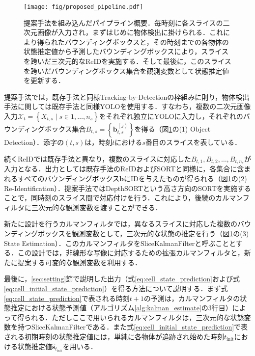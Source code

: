     \begin{figure}[t]
        \centering
        \texttt{[image: fig/proposed\_pipeline.pdf]}
        \caption[提案手法を組み込んだパイプライン概要]{提案手法を組み込んだパイプライン概要．毎時刻に各スライスの二次元画像が入力され，まずはじめに物体検出に掛けられる．これにより得られたバウンディングボックスと，その時刻までの各物体の状態推定値から予測したバウンディングボックスにより，スライスを跨いだ三次元的なReIDを実施する．そして最後に，このスライスを跨いだバウンディングボックス集合を観測変数として状態推定値を更新する．}
        \label{fig:proposed_pipeline}
    \end{figure}

    提案手法では，既存手法と同様Tracking-by-Detectionの枠組みに則り，物体検出手法に関しては既存手法と同様YOLOを使用する．すなわち，複数の二次元画像入力$\mathcal{X}_t = \left\{X_{t, s} \mid s \in {1, \dots, n_s}\right\}$をそれぞれ独立にYOLOに入力し，それぞれのバウンディングボックス集合$B_{t,s} = \left\{\bm{b}_{t,s}^{(j)}\right\}$を得る（図\ref{fig:proposed_pipeline}の(1) Object Detection）．添字の$(t,s)$は，時刻$t$における$s$番目のスライスを表している．

    続くReIDでは既存手法と異なり，複数のスライスに対応した$B_{t,1}, B_{t,2}, \dots, B_{t,n_s}$が入力となる．出力としては既存手法のReIDおよびSORTと同様に，各集合に含まれるすべてのバウンディングボックス$\bm{b}$にIDを与えたものが得られる（図\ref{fig:proposed_pipeline}の(2) Re-Identification）．提案手法ではDepthSORTという高さ方向のSORTを実施することで，同時刻のスライス間で対応付けを行う．これにより，後続のカルマンフィルタに三次元的な観測変数を渡すことができる．

    新たに設計を行うカルマンフィルタでは，異なるスライスに対応した複数のバウンディングボックスを観測変数として，三次元的な状態の推定を行う（図\ref{fig:proposed_pipeline}の(3) State Estimation）．このカルマンフィルタをSliceKalmanFilterと呼ぶこととする．この設計では，非線形な写像に対応するための拡張カルマンフィルタと，新たに提案する可変的な観測変数を利用する．

    最後に，\ref{sec:setting}節で説明した出力（式\ref{eq:cell_state_prediction}および式\ref{eq:cell_initial_state_prediction}）を得る方法について説明する．まず式\ref{eq:cell_state_prediction}で表される時刻$t+1$の予測は，カルマンフィルタの状態推定における状態予測値（アルゴリズム\ref{alg:kalman_estimate}の3行目）によって得られる．ただしここで用いられるカルマンフィルタは，三次元的な状態変数を持つSliceKalmanFilterである．また式\ref{eq:cell_initial_state_prediction}で表される初期時刻の状態推定値には，単純に各物体が追跡され始めた時刻$t_{\text{init}}$における状態推定値$\hat{\bm{s}}_{t_{\text{init}}}$を用いる．

